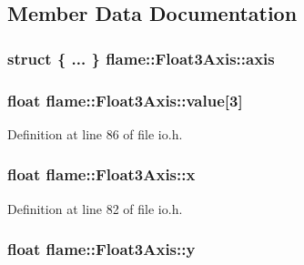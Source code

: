 \subsection{Member Data Documentation}
\hypertarget{unionflame_1_1_float3_axis_af6f6e4f42248d576ce450a9113a8c3f2}{
\subsubsection[{axis}]{\setlength{\rightskip}{0pt plus 5cm}struct \{ ... \}   flame\-::\-Float3\-Axis\-::axis}}\label{unionflame_1_1_float3_axis_af6f6e4f42248d576ce450a9113a8c3f2}
\hypertarget{unionflame_1_1_float3_axis_a76a0b46883c1466dafa1496626ef7ab5}{
\subsubsection[{value}]{\setlength{\rightskip}{0pt plus 5cm}float flame\-::\-Float3\-Axis\-::value\mbox{[}3\mbox{]}}}\label{unionflame_1_1_float3_axis_a76a0b46883c1466dafa1496626ef7ab5}


Definition at line 86 of file io.\-h.

\hypertarget{unionflame_1_1_float3_axis_a39959853d3267a6359a2251c2a44fa52}{
\subsubsection[{x}]{\setlength{\rightskip}{0pt plus 5cm}float flame\-::\-Float3\-Axis\-::x}}\label{unionflame_1_1_float3_axis_a39959853d3267a6359a2251c2a44fa52}


Definition at line 82 of file io.\-h.

\hypertarget{unionflame_1_1_float3_axis_a1c0869cfab2ad84c9100036df3d189ca}{
\subsubsection[{y}]{\setlength{\rightskip}{0pt plus 5cm}float flame\-::\-Float3\-Axis\-::y}}\label{unionflame_1_1_float3_axis_a1c0869cfab2ad84c9100036df3d189ca}


